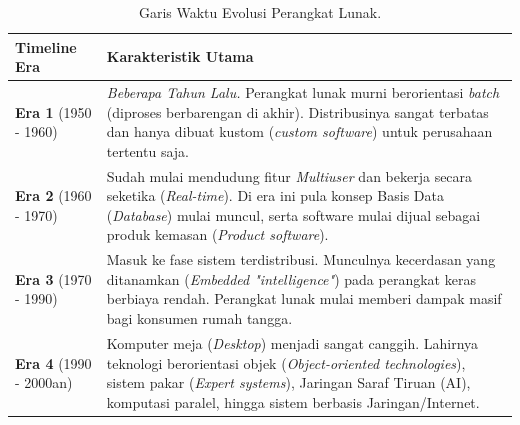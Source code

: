\documentclass[12pt,a4paper]{article}
\begin{document}
\begin{table}[h]
\centering
\begin{tabular}{@{}p{3cm}p{11cm}@{}}
\toprule
\textbf{Timeline Era} & \textbf{Karakteristik Utama} \\ \midrule
\textbf{Era 1} \newline (1950 - 1960) & \textit{Beberapa Tahun Lalu.} Perangkat lunak murni berorientasi \textit{batch} (diproses berbarengan di akhir). Distribusinya sangat terbatas dan hanya dibuat kustom (\textit{custom software}) untuk perusahaan tertentu saja. \\ \addlinespace
\textbf{Era 2} \newline (1960 - 1970) & Sudah mulai mendudung fitur \textit{Multiuser} dan bekerja secara seketika (\textit{Real-time}). Di era ini pula konsep Basis Data (\textit{Database}) mulai muncul, serta software mulai dijual sebagai produk kemasan (\textit{Product software}). \\ \addlinespace
\textbf{Era 3} \newline (1970 - 1990) & Masuk ke fase sistem terdistribusi. Munculnya kecerdasan yang ditanamkan (\textit{Embedded "intelligence"}) pada perangkat keras berbiaya rendah. Perangkat lunak mulai memberi dampak masif bagi konsumen rumah tangga. \\ \addlinespace
\textbf{Era 4} \newline (1990 - 2000an)& Komputer meja (\textit{Desktop}) menjadi sangat canggih. Lahirnya teknologi berorientasi objek (\textit{Object-oriented technologies}), sistem pakar (\textit{Expert systems}), Jaringan Saraf Tiruan (AI), komputasi paralel, hingga sistem berbasis Jaringan/Internet. \\ \bottomrule
\end{tabular}
\caption{Garis Waktu Evolusi Perangkat Lunak.}
\end{table}
\end{document}
